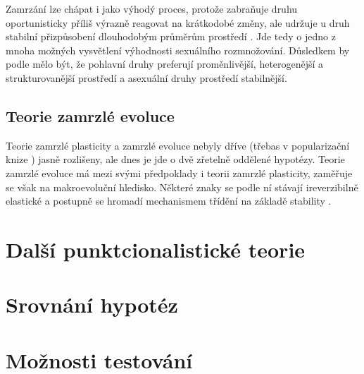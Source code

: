 Zamrzání lze chápat i jako výhodý proces, protože zabraňuje druhu oportunisticky příliš výrazně reagovat na
krátkodobé změny, ale udržuje u druh stabilní přizpůsobení dlouhodobým průměrům prostředí \citep[str. 195]{flegr2016}.
Jde tedy o jedno z mnoha možných vysvětlení výhodnosti sexuálního rozmnožování. Důsledkem by podle
\citet[str. 166--167]{toman2015} mělo být, že pohlavní druhy preferují proměnlivější, heterogenější
a strukturovanější prostředí a asexuální druhy prostředí stabilnější.

\subsection{Teorie zamrzlé evoluce}

Teorie zamrzlé plasticity a zamrzlé evoluce nebyly dříve (třebas v popularizační knize \citet{flegr2006})
jasně rozlišeny, ale dnes je jde o dvě zřetelně oddělené hypotézy.
Teorie zamrzlé evoluce má mezi svými předpoklady i teorii zamrzlé plasticity, zaměřuje se však na makroevoluční
hledisko. Některé znaky se podle ní stávají ireverzibilně elastické a postupně se hromadí mechanismem třídění
na základě stability \citep[str. 294--296]{flegr2016}.

\section{Další punktcionalistické teorie}

%
\section{Srovnání hypotéz}



\section{Možnosti testování}
%
